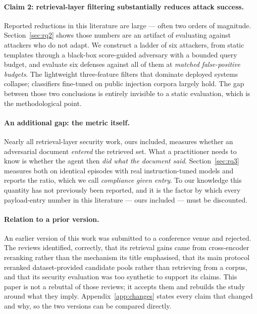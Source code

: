 \documentclass{article}
\begin{document}
\paragraph{Claim 2: retrieval-layer filtering substantially reduces attack
success.} Reported reductions in this literature are large --- often two orders
of magnitude. Section~\ref{sec:rq2} shows those numbers are an artifact of
evaluating against attackers who do not adapt. We construct a ladder of six
attackers, from static templates through a black-box score-guided adversary
with a bounded query budget, and evaluate six defenses against all of them at
\emph{matched false-positive budgets}. The lightweight three-feature filters
that dominate deployed systems collapse; classifiers fine-tuned on public
injection corpora largely hold. The gap between those two conclusions is
entirely invisible to a static evaluation, which is the methodological point.

\paragraph{An additional gap: the metric itself.} Nearly all retrieval-layer
security work, ours included, measures whether an adversarial document
\emph{entered} the retrieved set. What a practitioner needs to know is whether
the agent then \emph{did what the document said}. Section~\ref{sec:rq3}
measures both on identical episodes with real instruction-tuned models and
reports the ratio, which we call \emph{compliance given entry}. To our
knowledge this quantity has not previously been reported, and it is the factor
by which every payload-entry number in this literature --- ours included ---
must be discounted.

\paragraph{Relation to a prior version.} An earlier version of this work was
submitted to a conference venue and rejected. The reviews identified, correctly,
that its retrieval gains came from cross-encoder reranking rather than the
mechanism its title emphasised, that its main protocol reranked
dataset-provided candidate pools rather than retrieving from a corpus, and that
its security evaluation was too synthetic to support its claims. This paper is
not a rebuttal of those reviews; it accepts them and rebuilds the study around
what they imply. Appendix~\ref{app:changes} states every claim that changed and
why, so the two versions can be compared directly.
\end{document}

